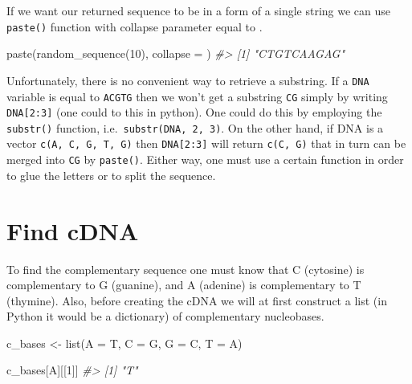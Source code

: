 \documentclass[
]{book}
\newenvironment{Shaded}{\begin{snugshade}}{\end{snugshade}}
\newcommand{\AttributeTok}[1]{\textcolor[rgb]{0.77,0.63,0.00}{#1}}
\newcommand{\CommentTok}[1]{\textcolor[rgb]{0.56,0.35,0.01}{\textit{#1}}}
\newcommand{\DecValTok}[1]{\textcolor[rgb]{0.00,0.00,0.81}{#1}}
\newcommand{\FunctionTok}[1]{\textcolor[rgb]{0.00,0.00,0.00}{#1}}
\newcommand{\NormalTok}[1]{#1}
\newcommand{\OtherTok}[1]{\textcolor[rgb]{0.56,0.35,0.01}{#1}}
\newcommand{\StringTok}[1]{\textcolor[rgb]{0.31,0.60,0.02}{#1}}
\begin{document}
If we want our returned sequence to be in a form of a single string we can use \texttt{paste()} function with collapse parameter equal to \texttt{\textquotesingle{}\textquotesingle{}}.

\begin{Shaded}
\begin{Highlighting}[]
\FunctionTok{paste}\NormalTok{(}\FunctionTok{random\_sequence}\NormalTok{(}\DecValTok{10}\NormalTok{), }\AttributeTok{collapse =} \StringTok{\textquotesingle{}\textquotesingle{}}\NormalTok{)}
\CommentTok{\#\textgreater{} [1] "CTGTCAAGAG"}
\end{Highlighting}
\end{Shaded}

Unfortunately, there is no convenient way to retrieve a substring. If a \texttt{DNA} variable is equal to \texttt{\textquotesingle{}ACGTG\textquotesingle{}} then we won't get a substring \texttt{\textquotesingle{}CG\textquotesingle{}} simply by writing \texttt{DNA{[}2:3{]}} (one could to this in python). One could do this by employing the \texttt{substr()} function, i.e.~\texttt{substr(DNA,\ 2,\ 3)}. On the other hand, if DNA is a vector \texttt{c(\textquotesingle{}A\textquotesingle{},\ \textquotesingle{}C\textquotesingle{},\ \textquotesingle{}G\textquotesingle{},\ \textquotesingle{}T\textquotesingle{},\ \textquotesingle{}G\textquotesingle{})} then \texttt{DNA{[}2:3{]}} will return \texttt{c(\textquotesingle{}C\textquotesingle{},\ \textquotesingle{}G\textquotesingle{})} that in turn can be merged into \texttt{\textquotesingle{}CG\textquotesingle{}} by \texttt{paste()}. Either way, one must use a certain function in order to glue the letters or to split the sequence.

\hypertarget{find-cdna}{%
\section{Find cDNA}\label{find-cdna}}

To find the complementary sequence one must know that C (cytosine) is complementary to G (guanine), and A (adenine) is complementary to T (thymine). Also, before creating the cDNA we will at first construct a list (in Python it would be a dictionary) of complementary nucleobases.

\begin{Shaded}
\begin{Highlighting}[]
\NormalTok{c\_bases }\OtherTok{\textless{}{-}} \FunctionTok{list}\NormalTok{(}\StringTok{\textquotesingle{}A\textquotesingle{}} \OtherTok{=} \StringTok{\textquotesingle{}T\textquotesingle{}}\NormalTok{, }\StringTok{\textquotesingle{}C\textquotesingle{}} \OtherTok{=} \StringTok{\textquotesingle{}G\textquotesingle{}}\NormalTok{, }\StringTok{\textquotesingle{}G\textquotesingle{}} \OtherTok{=} \StringTok{\textquotesingle{}C\textquotesingle{}}\NormalTok{, }\StringTok{\textquotesingle{}T\textquotesingle{}} \OtherTok{=} \StringTok{\textquotesingle{}A\textquotesingle{}}\NormalTok{)}

\NormalTok{c\_bases[}\StringTok{\textquotesingle{}A\textquotesingle{}}\NormalTok{][[}\DecValTok{1}\NormalTok{]]}
\CommentTok{\#\textgreater{} [1] "T"}
\end{Highlighting}
\end{Shaded}
\end{document}
